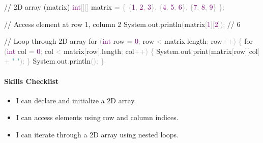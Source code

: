\documentclass[
  justified,
  openright,
]{tufte-book}
\let\subsubsection\paragraph
\let\paragraph\paragraph
\newcommand{\BuiltInTok}[1]{#1}
\newcommand{\CommentTok}[1]{\textcolor{MidGray}{#1}}
\newcommand{\ControlFlowTok}[1]{\textcolor{BrandBlue}{#1}}
\newcommand{\DataTypeTok}[1]{\textcolor{Purple}{#1}}
\newcommand{\DecValTok}[1]{\textcolor{Purple}{#1}}
\newcommand{\FunctionTok}[1]{\textcolor{BrandBlue}{#1}}
\newcommand{\NormalTok}[1]{#1}
\newcommand{\OperatorTok}[1]{\textcolor{DarkGray}{#1}}
\newcommand{\StringTok}[1]{\textcolor{Teal}{#1}}
\newenvironment{Shaded}{%
  \begin{snugshade}
}{%
  \end{snugshade}
}
\let\subsubsection\paragraph
\let\paragraph\paragraph
\providecommand{\tightlist}{%
  \setlength{\itemsep}{0pt}\setlength{\parskip}{0pt}}
\begin{document}
\begin{Shaded}
\begin{Highlighting}[]
\CommentTok{// 2D array (matrix)}
\DataTypeTok{int}\OperatorTok{[][]}\NormalTok{ matrix }\OperatorTok{=} \OperatorTok{\{}
    \OperatorTok{\{}\DecValTok{1}\OperatorTok{,} \DecValTok{2}\OperatorTok{,} \DecValTok{3}\OperatorTok{\},}
    \OperatorTok{\{}\DecValTok{4}\OperatorTok{,} \DecValTok{5}\OperatorTok{,} \DecValTok{6}\OperatorTok{\},}
    \OperatorTok{\{}\DecValTok{7}\OperatorTok{,} \DecValTok{8}\OperatorTok{,} \DecValTok{9}\OperatorTok{\}}
\OperatorTok{\};}

\CommentTok{// Access element at row 1, column 2}
\BuiltInTok{System}\OperatorTok{.}\FunctionTok{out}\OperatorTok{.}\FunctionTok{println}\OperatorTok{(}\NormalTok{matrix}\OperatorTok{[}\DecValTok{1}\OperatorTok{][}\DecValTok{2}\OperatorTok{]);}   \CommentTok{// 6}

\CommentTok{// Loop through 2D array}
\ControlFlowTok{for} \OperatorTok{(}\DataTypeTok{int}\NormalTok{ row }\OperatorTok{=} \DecValTok{0}\OperatorTok{;}\NormalTok{ row }\OperatorTok{\textless{}}\NormalTok{ matrix}\OperatorTok{.}\FunctionTok{length}\OperatorTok{;}\NormalTok{ row}\OperatorTok{++)} \OperatorTok{\{}
    \ControlFlowTok{for} \OperatorTok{(}\DataTypeTok{int}\NormalTok{ col }\OperatorTok{=} \DecValTok{0}\OperatorTok{;}\NormalTok{ col }\OperatorTok{\textless{}}\NormalTok{ matrix}\OperatorTok{[}\NormalTok{row}\OperatorTok{].}\FunctionTok{length}\OperatorTok{;}\NormalTok{ col}\OperatorTok{++)} \OperatorTok{\{}
        \BuiltInTok{System}\OperatorTok{.}\FunctionTok{out}\OperatorTok{.}\FunctionTok{print}\OperatorTok{(}\NormalTok{matrix}\OperatorTok{[}\NormalTok{row}\OperatorTok{][}\NormalTok{col}\OperatorTok{]} \OperatorTok{+} \StringTok{" "}\OperatorTok{);}
    \OperatorTok{\}}
    \BuiltInTok{System}\OperatorTok{.}\FunctionTok{out}\OperatorTok{.}\FunctionTok{println}\OperatorTok{();}
\OperatorTok{\}}
\end{Highlighting}
\end{Shaded}

\subsubsection{Skills Checklist}\label{skills-checklist-12}

\begin{itemize}
\tightlist
\item[$\square$]
  I can declare and initialize a 2D array.
\item[$\square$]
  I can access elements using row and column indices.
\item[$\square$]
  I can iterate through a 2D array using nested loops.
\end{itemize}
\end{document}
